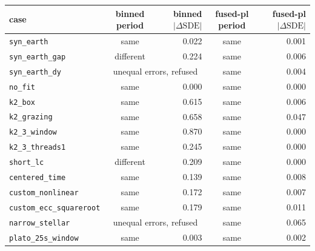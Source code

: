 \begin{tabular}{lcrcr}
\toprule
case & binned period & binned $|\Delta\mathrm{SDE}|$ & fused-pl period & fused-pl $|\Delta\mathrm{SDE}|$ \\
\midrule
\texttt{syn\_earth} & same & 0.022 & same & 0.001 \\
\texttt{syn\_earth\_gap} & different & 0.224 & same & 0.006 \\
\texttt{syn\_earth\_dy} & \multicolumn{2}{c}{unequal errors, refused} & same & 0.004 \\
\texttt{no\_fit} & same & 0.000 & same & 0.000 \\
\texttt{k2\_box} & same & 0.615 & same & 0.006 \\
\texttt{k2\_grazing} & same & 0.658 & same & 0.047 \\
\texttt{k2\_3\_window} & same & 0.870 & same & 0.000 \\
\texttt{k2\_3\_threads1} & same & 0.245 & same & 0.000 \\
\texttt{short\_lc} & different & 0.209 & same & 0.000 \\
\texttt{centered\_time} & same & 0.139 & same & 0.008 \\
\texttt{custom\_nonlinear} & same & 0.172 & same & 0.007 \\
\texttt{custom\_ecc\_squareroot} & same & 0.179 & same & 0.011 \\
\texttt{narrow\_stellar} & \multicolumn{2}{c}{unequal errors, refused} & same & 0.065 \\
\texttt{plato\_25s\_window} & same & 0.003 & same & 0.002 \\
\bottomrule
\end{tabular}
